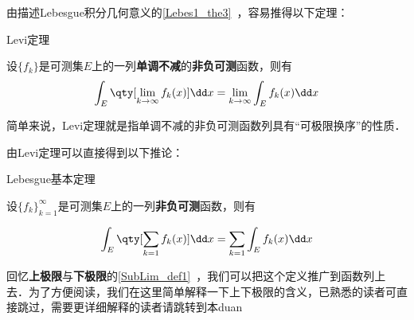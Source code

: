 

由描述Lebesgue积分几何意义的\autoref{Lebes1_the3}~，容易推得以下定理：

\begin{theorem}{Levi定理}

设$\{f_k\}$是可测集$E$上的一列\textbf{单调不减}的\textbf{非负可测}函数，则有
\begin{equation}
\int_E  \qty[\lim\limits_{k\to \infty} f_k(x)] \dd x = \lim\limits_{k\to \infty}\int_E f_k(x) \dd x
\end{equation}

\end{theorem}

简单来说，Levi定理就是指单调不减的非负可测函数列具有“可极限换序”的性质．

由Levi定理可以直接得到以下推论：

\begin{corollary}{Lebesgue基本定理}

设$\{f_k\}^\infty_{k=1}$是可测集$E$上的一列\textbf{非负可测}函数，则有

\begin{equation}
\int_E  \qty[\sum\limits_{k=1}f_k(x)] \dd x = \sum\limits_{k=1} \int_E f_k(x) \dd x
\end{equation}

\end{corollary}

回忆\textbf{上极限}与\textbf{下极限}的\autoref{SubLim_def1}~，我们可以把这个定义推广到函数列上去．为了方便阅读，我们在这里简单解释一下上下极限的含义，已熟悉的读者可直接跳过，需要更详细解释的读者请跳转到本duan














